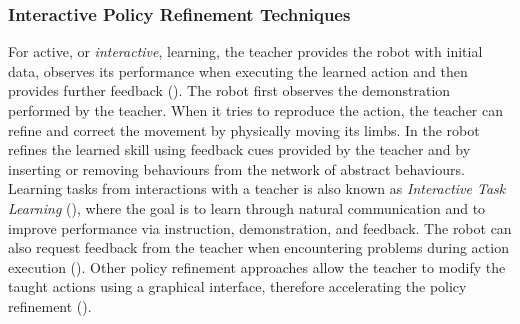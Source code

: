 
\subsubsection{Interactive Policy Refinement Techniques}\label{subsec:Other RP Methods}
For active, or \textit{interactive}, learning, the teacher provides the robot with initial data, observes its performance when executing the learned action and then provides further feedback (\cite{nicolescu2003natural,calinon2007active,calinon2007incremental}).
The robot first observes the demonstration performed by the teacher. 
When it tries to reproduce the action, the teacher can refine and correct the movement by physically moving its limbs.
In \cite{nicolescu2003natural} the robot refines the learned skill using feedback cues provided by the teacher and by inserting or removing behaviours from the network of abstract behaviours.
Learning tasks from interactions with a teacher is also known as \textit{Interactive Task Learning} (\cite{laird2017interactive}), where the goal is to learn through natural communication and to improve performance via instruction, demonstration, and feedback. 
The robot can also request feedback from the teacher when encountering problems during action execution (\cite{cakmak2012aaai,abdo2013learning,martinez2017relational}).
Other policy refinement approaches allow the teacher to modify the taught actions using a graphical interface, therefore accelerating the policy refinement %
 (\cite{alexandrova2015roboflow,paxton2017costar,perzylo2016intuitive,stenmark2017simplified}).


